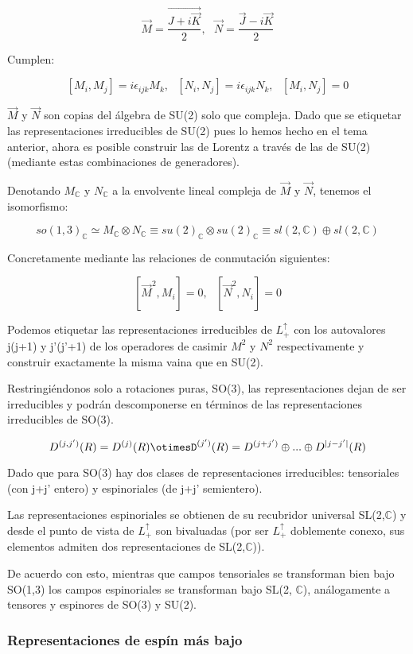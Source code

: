 $$\Vec{M}=\frac{\Vec{J+i\Vec{K}}}{2}, \ \ \ \Vec{N}=\frac{\Vec{J}-i\Vec{K}}{2}$$

Cumplen:

$$[M_i,M_j]=i\epsilon _{ijk}M_k, \ \ \ [N_i,N_j]=i\epsilon _{ijk}N_k, \ \ \ [M_i,N_j]=0$$

$\Vec{M}$ y $\Vec{N}$ son copias del álgebra de SU(2) solo que compleja. Dado que se etiquetar las representaciones irreducibles de SU(2) pues lo hemos hecho en el tema anterior, ahora es posible construir las de Lorentz a través de las de SU(2) (mediante estas combinaciones de generadores).

\smallskip
Denotando $M_\mathds{C}$ y $N_\mathds{C}$ a la envolvente lineal compleja de $\Vec{M}$ y $\Vec{N}$, tenemos el isomorfismo:

$$so(1,3)_\mathds{C}\simeq M_\mathds{C}\otimes N_\mathds{C} \equiv su(2)_\mathds{C}\otimes su(2)_\mathds{C} \equiv sl(2,\mathds{C}) \oplus sl(2,\mathds{C})$$

Concretamente mediante las relaciones de conmutación siguientes:

$$[\Vec{M}^2,M_i]=0, \ \ \ [\Vec{N}^2,N_i]=0$$

Podemos etiquetar las representaciones irreducibles de $L^\uparrow _+$ con los autovalores j(j+1) y j'(j'+1) de los operadores de casimir $M^2$ y $N^2$ respectivamente y construir exactamente la misma vaina que en SU(2).

Restringiéndonos solo a rotaciones puras, SO(3), las representaciones dejan de ser irreducibles y podrán descomponerse en términos de las representaciones irreducibles de SO(3).

$$D^{(j,j')}(R)=D^{(j)}(R)\otimesD^{(j')}(R)=D^{(j+j')}\oplus ... \oplus D^{|j-j'|}(R)$$

Dado que para SO(3) hay dos clases de representaciones irreducibles: tensoriales (con j+j' entero) y espinoriales (de j+j' semientero).

Las representaciones espinoriales se obtienen de su recubridor universal SL(2,$\mathds{C}$) y desde el punto de vista de $L^\uparrow _+$ son bivaluadas (por ser $L^\uparrow _+$ doblemente conexo, sus elementos admiten dos representaciones de SL(2,$\mathds{C}$)).

\smallskip
De acuerdo con esto, mientras que campos tensoriales se transforman bien bajo SO(1,3) los campos espinoriales se transforman bajo SL(2, $\mathds{C}$), análogamente a tensores y espinores de SO(3) y SU(2).

\subsubsection{Representaciones de espín más bajo}

